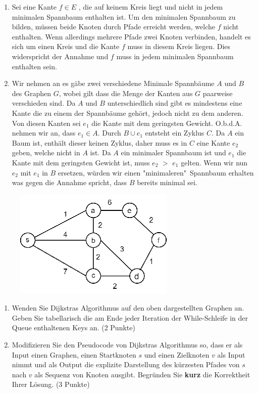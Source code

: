 \documentclass[ngerman,landscape,twocolumn]{adtexsheet}
\begin{document}
\begin{solution}
    \begin{enumerate}
       \item 
       Sei eine Kante $f \in E$ , die auf keinem Kreis liegt und nicht in jedem minimalen Spannbaum enthalten ist. Um den minimalen Spannbaum zu bilden, müssen beide Knoten durch Pfade erreicht werden, welche $f$ nicht enthalten. Wenn allerdings mehrere Pfade zwei Knoten verbinden, handelt es sich um einen Kreis und die Kante $f$ muss in diesem Kreis liegen. Dies widerspricht der Annahme und $f$ muss in jedem minimalen Spannbaum enthalten sein.
       \item
       Wir nehmen an es gäbe zwei verschiedene Minimale Spannbäume $A$ und $B$ des Graphen $G$, wobei gilt dass die Menge der Kanten aus $G$ paarweise verschieden sind. Da $A$ und $B$ unterschiedlich sind gibt es mindestens eine Kante die zu einem der Spannbäume gehört, jedoch nicht zu dem anderen. Von diesen Kanten sei $e_1$ die Kante mit dem geringsten Gewicht. O.b.d.A. nehmen wir an, dass $e_1 \in A$. Durch $B \cup e_1$ entsteht ein Zyklus $C$. Da $A$ ein Baum ist, enthält dieser keinen Zyklus, daher muss es in $C$ eine Kante $e_2$ geben, welche nicht in $A$ ist. Da $A$ ein minimaler Spannbaum ist und $e_1$ die Kante mit dem geringsten Gewicht ist, muss $e_2$ $>$ $e_1$ gelten. Wenn wir nun $e_2$ mit $e_1$ in $B$ ersetzen, würden wir einen "minimaleren" \,Spannbaum erhalten was gegen die Annahme spricht, dass $B$ bereits minimal sei.
    \end{enumerate}
\end{solution}

\begin{question}
    \begin{figure}
        \centering
        \includegraphics[width=.4\linewidth]{images/ex6q5.png}
        \label{fig:my_label}
    \end{figure}
    \begin{enumerate}
        \item Wenden Sie Dijkstras Algorithmus auf den oben dargestellten Graphen an. Geben Sie tabellarisch die am Ende jeder Iteration der While-Schleife in der Queue enthaltenen Keys an. (2 Punkte)
        \item Modifizieren Sie den Pseudocode von Dijkstras Algorithmus so, dass er als Input einen Graphen, einen Startknoten $s$ und einen Zielknoten $v$ als Input nimmt und als Output die explizite Darstellung des kürzesten Pfades von $s$ nach $v$ als Sequenz von Knoten ausgibt. Begründen Sie \textbf{kurz} die Korrektheit Ihrer Lösung. (3 Punkte)
    \end{enumerate}
\end{question}
\end{document}
